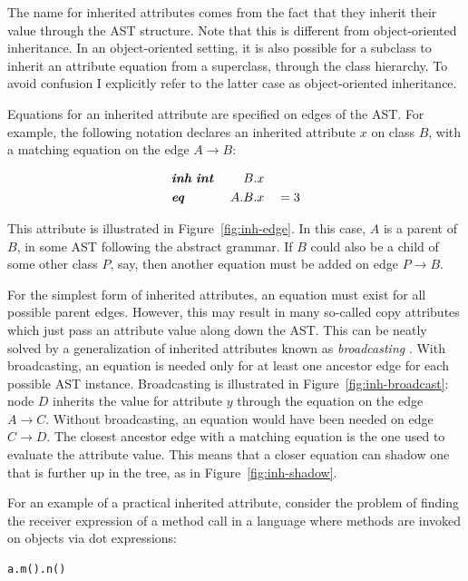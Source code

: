 \documentclass[10pt, twoside, openright]{book}
\newcommand{\figref}[1]{Figure~\ref{#1}}
\begin{document}
The name for inherited attributes comes from the fact that they
inherit their value through the AST structure. Note that this is different from object-oriented
inheritance. In an object-oriented setting, it is also
possible for a subclass to inherit an attribute equation from a superclass, through the
class hierarchy. To avoid
confusion I explicitly refer to the latter case as object-oriented inheritance.

Equations for an inherited attribute are specified on edges of the AST.
For example, the following notation declares an inherited attribute $x$ on class
$B$, with a matching equation on the edge $A \to B$:


\begin{alignat*}{3}
& \textbf{\textit{inh}} \; \textbf{\textit{int}} & \; B.&x && \\
& \textbf{\textit{eq}} & \; A.B.&x &&= 3
\end{alignat*}

\noindent
This attribute is illustrated in \figref{fig:inh-edge}. In this case, $A$ is a parent of $B$,
in some AST following the abstract grammar.
If $B$ could also be a child of some other
class $P$, say, then another equation must be added on edge $P \to B$.

For the simplest form of inherited attributes, an equation must exist for all possible parent edges.
However, this may result in many so-called copy attributes which just pass an attribute value along
down the AST. This can be neatly solved by a generalization of inherited attributes known as
\emph{broadcasting} \cite{Hedin2011}. With broadcasting, an equation is needed only
for at least one ancestor edge for each possible AST instance.
Broadcasting is illustrated in
\figref{fig:inh-broadcast}: node $D$ inherits the value for attribute $y$ through the equation on
the edge $A \to C$. Without broadcasting, an equation would have been needed on edge $C
\to D$. The closest ancestor edge with a matching equation is the one used to evaluate
the attribute value. This means that a closer equation can shadow one that is further up in the tree,
as in \figref{fig:inh-shadow}.

For an example of a practical inherited attribute, consider the problem of
finding the receiver expression of a method call in a language where methods
are invoked on objects via dot expressions:

\begin{lstlisting}
a.m().n()
\end{lstlisting}
\end{document}
